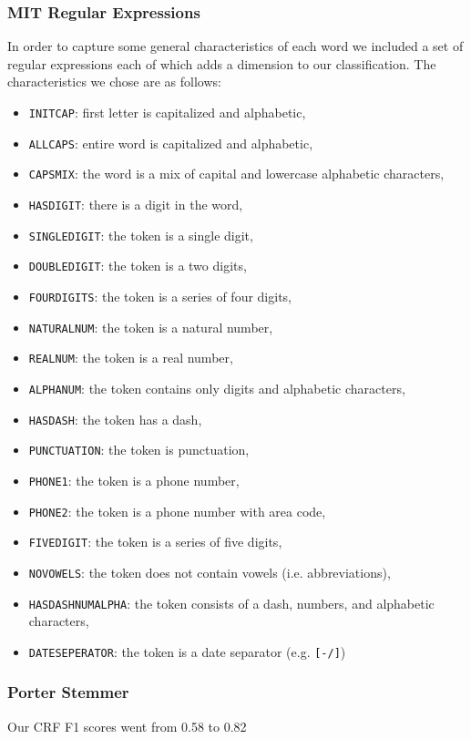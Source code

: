 \documentclass[preprint]{style}
\begin{document}
\subsubsection{MIT Regular Expressions}
In order to capture some general characteristics of each word we included a set of regular expressions each of which adds a dimension to our classification. The characteristics we chose are as follows:
\begin{itemize}
\item {\tt INITCAP}: first letter is capitalized and alphabetic,
\item {\tt ALLCAPS}: entire word is capitalized and alphabetic,
\item {\tt CAPSMIX}: the word is a mix of capital and lowercase alphabetic characters,
\item {\tt HASDIGIT}: there is a digit in the word,
\item {\tt SINGLEDIGIT}: the token is a single digit,
\item {\tt DOUBLEDIGIT}: the token is a two digits,
\item {\tt FOURDIGITS}: the token is a series of four digits,
\item {\tt NATURALNUM}: the token is a natural number,
\item {\tt REALNUM}: the token is a real number,
\item {\tt ALPHANUM}: the token contains only digits and alphabetic characters,
\item {\tt HASDASH}: the token has a dash,
\item {\tt PUNCTUATION}: the token is punctuation,
\item {\tt PHONE1}: the token is a phone number,
\item {\tt PHONE2}: the token is a phone number with area code,
\item {\tt FIVEDIGIT}: the token is a series of five digits,
\item {\tt NOVOWELS}: the token does not contain vowels (i.e. abbreviations),
\item {\tt HASDASHNUMALPHA}: the token consists of a dash, numbers, and alphabetic characters, 
\item {\tt DATESEPERATOR}: the token is a date separator (e.g. {\tt [-/]})
\end{itemize}


\subsubsection{Porter Stemmer}
Our CRF F1 scores went from 0.58 to 0.82
\end{document}
